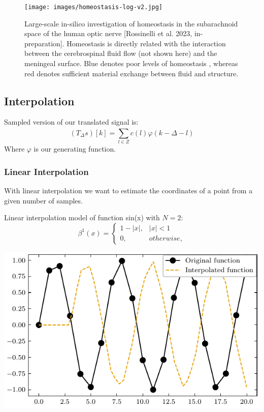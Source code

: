 \documentclass[]{usiinfbachelorproject}
\begin{document}
	


	\begin{figure}[h]
	\centering
	\texttt{[image: images/homeostasis-log-v2.jpg]}
	\caption{Large-scale in-silico investigation of homeostasis in the subarachnoid space of the human optic nerve [Rossinelli et al. 2023, in-preparation]. Homeostasis is directly related with the interaction between the cerebrospinal fluid flow (not shown here) and the meningeal surface. Blue denotes poor levels of homeostasis , whereas red denotes sufficient material exchange between fluid and structure.}
	\cite{main_article}
	\end{figure}
	
	\iffalse
	
	\subsection{Interpolation}
	Sampled version of our translated signal is:
	\begin{equation}
		(T_\Delta s)[k] = \sum_{l \in Z}^{} c(l)\varphi(k - \Delta - l)
	\end{equation}
	Where $\varphi$ is our generating function.
	\subsubsection{Linear Interpolation}
	With linear interpolation we want to estimate the coordinates of a point from a given number of samples. 
	
	Linear interpolation model of function sin(x) with $N = 2$:
	\begin{equation}
		\beta^1(x) = 
		\begin{cases}
			1 - |x|, & |x| < 1    \\
			0,       & otherwise, 
		\end{cases}
	\end{equation}
	\begin{center}
		\includegraphics{"images/linear_interpolation_example.pdf"}
	\end{center}
	
\end{document}
